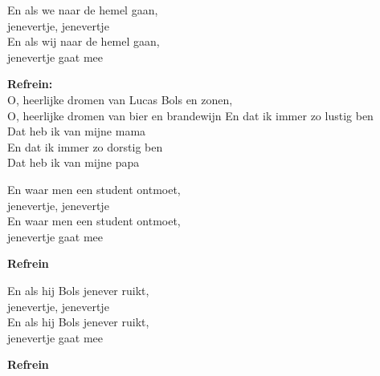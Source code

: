 En als we naar de hemel gaan,\\
jenevertje, jenevertje\\
En als wij naar de hemel gaan,\\
jenevertje gaat mee

\textbf{Refrein:}\\
O, heerlijke dromen van Lucas Bols en zonen,\\
O, heerlijke dromen van bier en brandewijn
En dat ik immer zo lustig ben\\
Dat heb ik van mijne mama\\
En dat ik immer zo dorstig ben \\
Dat heb ik van mijne papa

En waar men een student ontmoet,\\
jenevertje, jenevertje\\
En waar men een student ontmoet,\\
jenevertje gaat mee

\textbf{Refrein}

En als hij Bols jenever ruikt,\\
jenevertje, jenevertje\\
En als hij Bols jenever ruikt,\\
jenevertje gaat mee

\textbf{Refrein}
